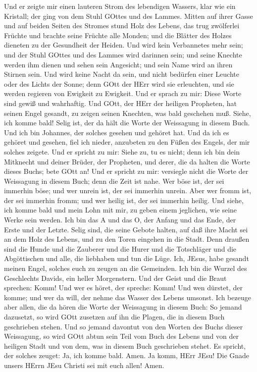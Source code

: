  Und er zeigte mir einen lauteren Strom des lebendigen
Wassers, klar wie ein Kristall; der ging von dem Stuhl GOttes und des
Lammes.  Mitten auf ihrer Gasse und auf beiden Seiten des
Stromes stund Holz des Lebens, das trug zwölferlei Früchte und brachte
seine Früchte alle Monden; und die Blätter des Holzes dieneten zu der
Gesundheit der Heiden.  Und wird kein Verbannetes mehr sein;
und der Stuhl GOttes und des Lammes wird darinnen sein; und seine
Knechte werden ihm dienen  und sehen sein Angesicht; und
sein Name wird an ihren Stirnen sein.  Und wird keine Nacht
da sein, und nicht bedürfen einer Leuchte oder des Lichts der Sonne;
denn GOtt der HErr wird sie erleuchten, und sie werden regieren von
Ewigkeit zu Ewigkeit.  Und er sprach zu mir: Diese Worte
sind gewiß und wahrhaftig. Und GOtt, der HErr der heiligen Propheten,
hat seinen Engel gesandt, zu zeigen seinen Knechten, was bald geschehen
muß.  Siehe, ich komme bald! Selig ist, der da hält die
Worte der Weissagung in diesem Buch.  Und ich bin Johannes,
der solches gesehen und gehöret hat. Und da ich es gehöret und gesehen,
fiel ich nieder, anzubeten zu den Füßen des Engels, der mir solches
zeigete.  Und er spricht zu mir: Siehe zu, tu es nicht; denn
ich bin dein Mitknecht und deiner Brüder, der Propheten, und derer, die
da halten die Worte dieses Buchs; bete GOtt an!  Und er
spricht zu mir: versiegle nicht die Worte der Weissagung in diesem Buch;
denn die Zeit ist nahe.  Wer böse ist, der sei immerhin
böse; und wer unrein ist, der sei immerhin unrein. Aber wer fromm ist,
der sei immerhin fromm; und wer heilig ist, der sei immerhin heilig.
 Und siehe, ich komme bald und mein Lohn mit mir, zu geben
einem jeglichen, wie seine Werke sein werden.  Ich bin das
A und das O, der Anfang und das Ende, der Erste und der Letzte.
 Selig sind, die seine Gebote halten, auf daß ihre Macht
sei an dem Holz des Lebens, und zu den Toren eingehen in die Stadt.
 Denn draußen sind die Hunde und die Zauberer und die Hurer
und die Totschläger und die Abgöttischen und alle, die liebhaben und tun
die Lüge.  Ich, JEsus, habe gesandt meinen Engel, solches
euch zu zeugen an die Gemeinden. Ich bin die Wurzel des Geschlechts
Davids, ein heller Morgenstern.  Und der Geist und die
Braut sprechen: Komm! Und wer es höret, der spreche: Komm! Und wen
dürstet, der komme; und wer da will, der nehme das Wasser des Lebens
umsonst.  Ich bezeuge aber allen, die da hören die Worte
der Weissagung in diesem Buch: So jemand dazusetzt, so wird GOtt
zusetzen auf ihn die Plagen, die in diesem Buch geschrieben stehen.
 Und so jemand davontut von den Worten des Buchs dieser
Weissagung, so wird GOtt abtun sein Teil vom Buch des Lebens und von der
heiligen Stadt und von dem, was in diesem Buch geschrieben stehet.
 Es spricht, der solches zeuget: Ja, ich komme bald. Amen.
Ja komm, HErr JEsu!  Die Gnade unsers HErrn JEsu Christi
sei mit euch allen! Amen.
